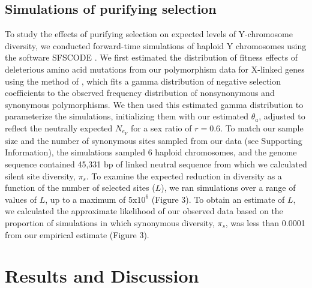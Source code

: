 \documentclass[9pt,twocolumn,twoside]{gsajnl}
\begin{document}
\subsection*{Simulations of purifying selection}
To study the effects of purifying selection on expected levels of Y-chromosome diversity, we conducted forward-time simulations of haploid Y chromosomes using the software SFSCODE \citep{hernandez2008flexible}. We first estimated the distribution of fitness effects of deleterious amino acid mutations from our polymorphism data for X-linked genes using the method of \citet*{keightley2007joint}, which fits a gamma distribution of negative selection coefficients to the observed frequency distribution of nonsynonymous and synonymous polymorphisms. We then used this estimated gamma distribution to parameterize the simulations, initializing them with our estimated $\theta_{a}$, adjusted to reflect the neutrally expected $N_{e_{Y}}$ for a sex ratio of $r=0.6$. To match our sample size and the number of synonymous sites sampled from our data (see Supporting Information), the simulations sampled 6 haploid chromosomes, and the genome sequence contained 45,331 bp of linked neutral sequence from which we calculated silent site diversity, $\pi_{s}$. To examine the expected reduction in diversity as a function of the number of selected sites ($L$), we ran simulations over a range of values of $L$, up to a maximum of 5x$10^{6}$ (Figure 3). To obtain an estimate of $L$, we calculated the approximate likelihood of our observed data based on the proportion of simulations in which synonymous diversity, $\pi_{s}$, was less than 0.0001 from our empirical estimate (Figure 3).

\section*{Results and Discussion}
\end{document}
